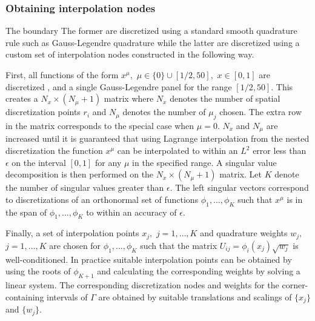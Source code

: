 
\subsubsection{Obtaining interpolation nodes}

The boundary The former are discretized using a standard smooth quadrature rule such as Gauss-Legendre quadrature while the latter are discretized using a custom set of interpolation nodes constructed in the following way.

First, all functions of the form $x^\mu,$ $\mu \in \{0\} \cup [1/2,50],$ $x \in [0,1]$ are discretized , and  a single Gauss-Legendre panel for the range $[1/2,50].$ This creates a $N_x \times (N_\mu+1)$ matrix where $N_x$ denotes the number of spatial discretization points $r_i$ and $N_\mu$ denotes the number of $\mu_j$ chosen. The extra row in the matrix corresponds to the special case when $\mu = 0.$ $N_x$ and $N_\mu$ are increased until it is guaranteed that using Lagrange interpolation from the nested discretization the function $x^\mu$ can be interpolated to within an $L^2$ error less than $\epsilon$ on the interval $[0,1]$ for any $\mu$ in the specified range. A singular value decomposition is then performed on the $N_x \times (N_\mu+1)$ matrix. Let $K$ denote the number of singular values greater than $\epsilon.$ The left singular vectors correspond to discretizations of an orthonormal set of functions $\phi_1,\dots,\phi_K$ such that $x^\mu$ is in the span of $\phi_1,\dots,\phi_K$ to within an accuracy of $\epsilon.$

Finally, a set of interpolation points $x_j,$ $j=1,\dots,K$ and quadrature weights $w_j,$ $j=1,\dots,K$ are chosen for $\phi_1,\dots,\phi_K$ such that the matrix $U_{ij} = \phi_i(x_j) \sqrt{w_j}$ is well-conditioned. In practice suitable interpolation points can be obtained by using the roots of $\phi_{K+1}$ and calculating the corresponding weights by solving a linear system. The corresponding discretization nodes and weights for the corner-containing intervals of $\Gamma$ are obtained by suitable translations and scalings of $\{x_j\}$ and $\{w_j\}.$ 

